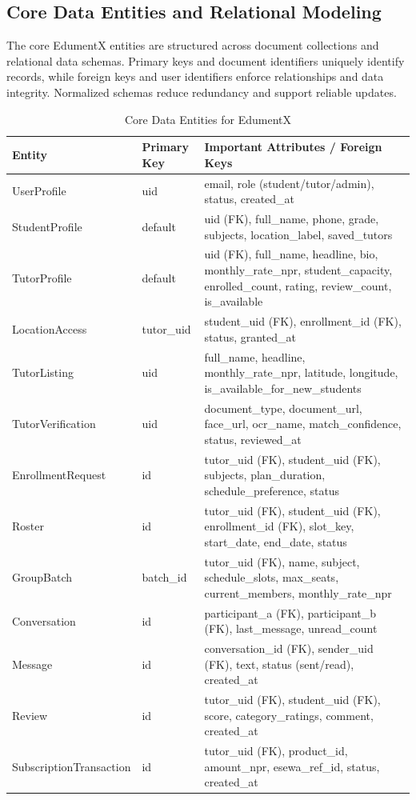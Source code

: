 \documentclass[12pt]{report}
\begin{document}
\subsection{Core Data Entities and Relational Modeling}
The core EdumentX entities are structured across document collections and relational data schemas. Primary keys and document identifiers uniquely identify records, while foreign keys and user identifiers enforce relationships and data integrity. Normalized schemas reduce redundancy and support reliable updates.

\begin{table}[H]
\centering
\caption{Core Data Entities for EdumentX}
\label{tab:core_entities}
\small
\begin{tabular}{|l|l|p{7.2cm}|}
\hline
\textbf{Entity} & \textbf{Primary Key} & \textbf{Important Attributes / Foreign Keys} \\
\hline
UserProfile & uid & email, role (student/tutor/admin), status, created\_at \\
\hline
StudentProfile & default & uid (FK), full\_name, phone, grade, subjects, location\_label, saved\_tutors \\
\hline
TutorProfile & default & uid (FK), full\_name, headline, bio, monthly\_rate\_npr, student\_capacity, enrolled\_count, rating, review\_count, is\_available \\
\hline
LocationAccess & tutor\_uid & student\_uid (FK), enrollment\_id (FK), status, granted\_at \\
\hline
TutorListing & uid & full\_name, headline, monthly\_rate\_npr, latitude, longitude, is\_available\_for\_new\_students \\
\hline
TutorVerification & uid & document\_type, document\_url, face\_url, ocr\_name, match\_confidence, status, reviewed\_at \\
\hline
EnrollmentRequest & id & tutor\_uid (FK), student\_uid (FK), subjects, plan\_duration, schedule\_preference, status \\
\hline
Roster & id & tutor\_uid (FK), student\_uid (FK), enrollment\_id (FK), slot\_key, start\_date, end\_date, status \\
\hline
GroupBatch & batch\_id & tutor\_uid (FK), name, subject, schedule\_slots, max\_seats, current\_members, monthly\_rate\_npr \\
\hline
Conversation & id & participant\_a (FK), participant\_b (FK), last\_message, unread\_count \\
\hline
Message & id & conversation\_id (FK), sender\_uid (FK), text, status (sent/read), created\_at \\
\hline
Review & id & tutor\_uid (FK), student\_uid (FK), score, category\_ratings, comment, created\_at \\
\hline
SubscriptionTransaction & id & tutor\_uid (FK), product\_id, amount\_npr, esewa\_ref\_id, status, created\_at \\
\hline
\end{tabular}
\end{table}
\end{document}
